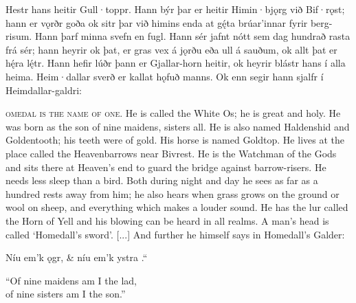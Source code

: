 \pva Hestr hans heitir Gull·toppr.
\pva Hann býr þar er heitir Himin·bjǫrg við Bif·rǫst;
\pva hann er vǫrðr goða ok sitr þar við himins enda at gę́ta brúar’innar fyrir berg-risum.
\pva Hann þarf minna svefn en fugl.
\pva Hann sér jafnt nótt sem dag hundrað rasta frá sér;
\pva hann heyrir ok þat, er gras vex á jǫrðu eða ull á sauðum, ok allt þat er hę́ra lę́tr.
\pva Hann hefir lúðr þann er Gjallar-horn heitir, ok heyrir blástr hans í alla heima.
\pva Heim·dallar sverð er kallat hǫfuð manns.  \pva[15]Ok enn segir hann sjalfr í Heimdallar-galdri:\epa

\bpb{}\textsc{omedal is the name of one.}
\pvb He is called the White Os;
\pvb he is great and holy.
\pvb He was born as the son of nine maidens, sisters all.
\pvb He is also named Haldenshid and Goldentooth; his teeth were of gold.
\pvb His horse is named Goldtop.
\pvb He lives at the place called the Heavenbarrows near Bivrest.
\pvb He is the Watchman of the Gods and sits there at Heaven’s end to guard the bridge against barrow-risers.
\pvb He needs less sleep than a bird.
\pvb Both during night and day he sees as far as a hundred rests away from him;
\pvb he also hears when grass grows on the ground or wool on sheep, and everything which makes a louder sound.
\pvb He has the lur called the Horn of Yell and his blowing can be heard in all realms.
\pvb A man’s head is called ‘Homedall’s sword’. {[...]} \pvb[15]And further he himself says in Homedall’s Galder:\epb\epg


\bvg\bva{}%
Níu em’k  ǫgr, &
níu em’k ystra .“\eva

\bvb “Of nine maidens am I the lad, \\
of nine sisters am I the son.”\evb\evg


